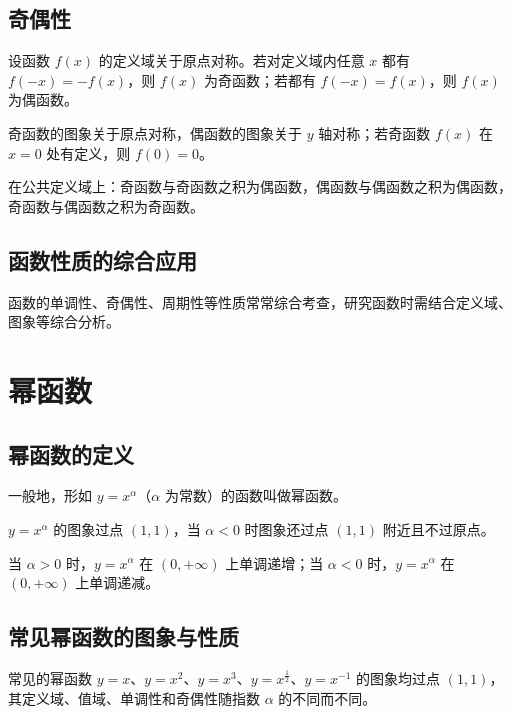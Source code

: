 \documentclass[lang=cn,newtx,10pt,scheme=chinese,nofont]{elegantbook}
\begin{document}
\subsection{奇偶性}
\begin{definition}[奇函数与偶函数]
设函数 $f(x)$ 的定义域关于原点对称。若对定义域内任意 $x$ 都有 $f(-x)=-f(x)$，则 $f(x)$ 为奇函数；若都有 $f(-x)=f(x)$，则 $f(x)$ 为偶函数。
\end{definition}
\begin{theorem}[奇偶函数的图象特征]
奇函数的图象关于原点对称，偶函数的图象关于 $y$ 轴对称；若奇函数 $f(x)$ 在 $x=0$ 处有定义，则 $f(0)=0$。
\end{theorem}
\begin{corollary}[奇偶性的运算]
在公共定义域上：奇函数与奇函数之积为偶函数，偶函数与偶函数之积为偶函数，奇函数与偶函数之积为奇函数。
\end{corollary}
\subsection{函数性质的综合应用}
\begin{definition}[函数性质的综合]
函数的单调性、奇偶性、周期性等性质常常综合考查，研究函数时需结合定义域、图象等综合分析。
\end{definition}

\section{幂函数}
\subsection{幂函数的定义}
\begin{definition}[幂函数]
一般地，形如 $y=x^\alpha$（$\alpha$ 为常数）的函数叫做幂函数。
\end{definition}
\begin{theorem}[幂函数过定点]
$y=x^\alpha$ 的图象过点 $(1,1)$，当 $\alpha<0$ 时图象还过点 $(1,1)$ 附近且不过原点。
\end{theorem}
\begin{corollary}[幂函数 $y=x^\alpha$ 在 $(0,+\infty)$ 上的单调性]
当 $\alpha>0$ 时，$y=x^\alpha$ 在 $(0,+\infty)$ 上单调递增；当 $\alpha<0$ 时，$y=x^\alpha$ 在 $(0,+\infty)$ 上单调递减。
\end{corollary}
\subsection{常见幂函数的图象与性质}
\begin{definition}[常见幂函数的性质]
常见的幂函数 $y=x$、$y=x^2$、$y=x^3$、$y=x^{\frac{1}{2}}$、$y=x^{-1}$ 的图象均过点 $(1,1)$，其定义域、值域、单调性和奇偶性随指数 $\alpha$ 的不同而不同。
\end{definition}
\end{document}
